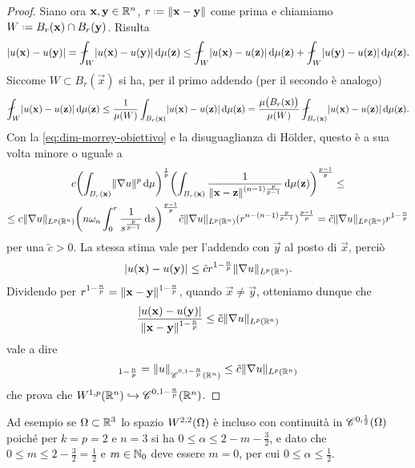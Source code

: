 \begin{proof}
    Siano ora $\vec x,\vec y\in\R^n$, $r\defeq\norm{\vec x-\vec y}$ come prima e chiamiamo $W\defeq B_r(\vec x)\cap B_r(\vec y)$.
    Risulta
    \begin{equation}
        \abs{u(\vec x)-u(\vec y)}=
        \avint_W \abs{u(\vec x)-u(\vec y)}\,\dd\mu(\vec z)\le
        \avint_W \abs{u(\vec x)-u(\vec z)}\,\dd\mu(\vec z)+\avint_W \abs{u(\vec y)-u(\vec z)}\,\dd\mu(\vec z).
    \end{equation}
    Siccome $W\subset B_r(\vec x)$ si ha, per il primo addendo (per il secondo è analogo)
    \begin{equation}
        \avint_W \abs{u(\vec x)-u(\vec z)}\,\dd\mu(\vec z)\le
        \frac1{\mu(W)}\int_{B_r(\vec x)}\abs{u(\vec x)-u(\vec z)}\,\dd\mu(\vec z)=
        \frac{\mu\bigl(B_r(\vec x)\bigr)}{\mu(W)}\avint_{B_r(\vec x)}\abs{u(\vec x)-u(\vec z)}\,\dd\mu(\vec z).
    \end{equation}
    Con la \eqref{eq:dim-morrey-obiettivo} e la disuguaglianza di Hölder, questo è a sua volta minore o uguale a
    \begin{multline}
        c\biggl(\int_{B_r(\vec x)}\norm{\grad u}^p\,\dd\mu\biggr)^\frac1{p}\biggl(\int_{B_r(\vec x)}\frac1{\norm{\vec x-\vec z}^{(n-1)\frac{p}{p-1}}}\,\dd\mu(\vec z)\biggr)^\frac{p-1}{p}\le\\ \le
        c\norm{\grad u}_{\leb[p]{\R^n}}\biggl(n\omega_n\int_0^r \frac1{s^\frac{p}{p-1}}\,\dd s\biggr)^\frac{p-1}{p}
        \tilde{c}\norm{\grad u}_{\leb[p]{\R^n}}(r^{n-(n-1)\frac{p}{p-1}})^\frac{p-1}{p}=
        \tilde{c}\norm{\grad u}_{\leb[p]{\R^n}}r^{1-\frac{n}{p}}
    \end{multline}
    per una $\tilde{c}>0$.
    La stessa stima vale per l'addendo con $\vec y$ al posto di $\vec x$, perciò
    \begin{equation}
        \abs{u(\vec x)-u(\vec y)}\le\tilde{c}r^{1-\frac{n}{p}}\norm{\grad u}_{\leb[p]{\R^n}}.
    \end{equation}
    Dividendo per $r^{1-\frac{n}{p}}=\norm{\vec x-\vec y}^{1-\frac{n}{p}}$, quando $\vec x\ne\vec y$, otteniamo dunque che
    \begin{equation}
        \frac{\abs{u(\vec x)-u(\vec y)}}{\norm{\vec x-\vec y}^{1-\frac{n}{p}}}\le\tilde{c}\norm{\grad u}_{\leb[p]{\R^n}}
    \end{equation}
    vale a dire
    \begin{equation}
        [u]_{1-\frac{n}{p}}=\norm{u}_{\cont[0,1-\frac{n}{p}]{\R^n}}\le\tilde{c}\norm{\grad u}_{\leb[p]{\R^n}}
    \end{equation}
    che prova che $\sobW[1,p]{\R^n}\emb\cont[0,1-\frac{n}{p}]{\R^n}$.
\end{proof}
Ad esempio se $\Omega\subset\R^3$ lo spazio $\sobW[2,2]{\Omega}$ è incluso con continuità in $\cont[0,\frac12]{\Omega}$ poich\'e per $k=p=2$ e $n=3$ si ha $0\le\alpha\le 2-m-\frac32$, e dato che $0\le m\le 2-\frac32=\frac12$ e $m\in\N_0$ deve essere $m=0$, per cui $0\le\alpha\le\frac12$.
